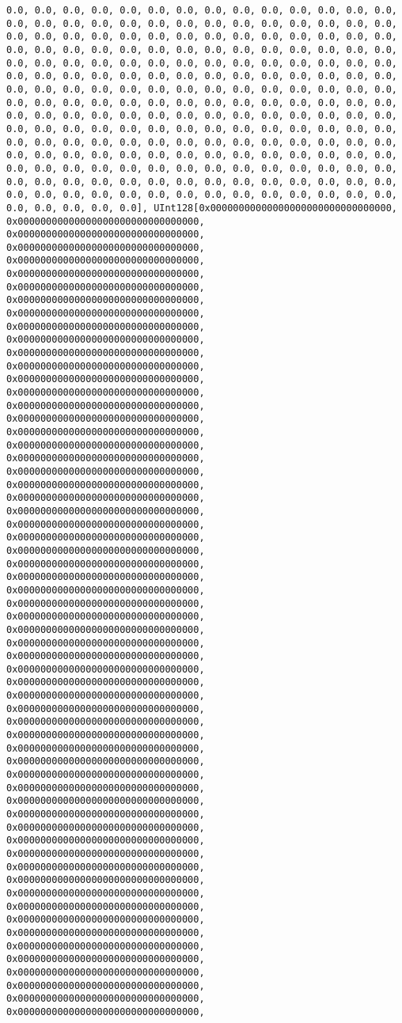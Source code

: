\documentclass[11pt]{article}
\begin{document}
\begin{verbatim}
0.0, 0.0, 0.0, 0.0, 0.0, 0.0, 0.0, 0.0, 0.0, 0.0, 0.0, 0.0, 0.0, 0.0, 0.0, 0.0, 0.0, 0.0, 0.0, 0.0, 0.0, 0.0, 0.0, 0.0, 0.0, 0.0, 0.0, 0.0, 0.0, 0.0, 0.0, 0.0, 0.0, 0.0, 0.0, 0.0, 0.0, 0.0, 0.0, 0.0, 0.0, 0.0, 0.0, 0.0, 0.0, 0.0, 0.0, 0.0, 0.0, 0.0, 0.0, 0.0, 0.0, 0.0, 0.0, 0.0, 0.0, 0.0, 0.0, 0.0, 0.0, 0.0, 0.0, 0.0, 0.0, 0.0, 0.0, 0.0, 0.0, 0.0, 0.0, 0.0, 0.0, 0.0, 0.0, 0.0, 0.0, 0.0, 0.0, 0.0, 0.0, 0.0, 0.0, 0.0, 0.0, 0.0, 0.0, 0.0, 0.0, 0.0, 0.0, 0.0, 0.0, 0.0, 0.0, 0.0, 0.0, 0.0, 0.0, 0.0, 0.0, 0.0, 0.0, 0.0, 0.0, 0.0, 0.0, 0.0, 0.0, 0.0, 0.0, 0.0, 0.0, 0.0, 0.0, 0.0, 0.0, 0.0, 0.0, 0.0, 0.0, 0.0, 0.0, 0.0, 0.0, 0.0, 0.0, 0.0, 0.0, 0.0, 0.0, 0.0, 0.0, 0.0, 0.0, 0.0, 0.0, 0.0, 0.0, 0.0, 0.0, 0.0, 0.0, 0.0, 0.0, 0.0, 0.0, 0.0, 0.0, 0.0, 0.0, 0.0, 0.0, 0.0, 0.0, 0.0, 0.0, 0.0, 0.0, 0.0, 0.0, 0.0, 0.0, 0.0, 0.0, 0.0, 0.0, 0.0, 0.0, 0.0, 0.0, 0.0, 0.0, 0.0, 0.0, 0.0, 0.0, 0.0, 0.0, 0.0, 0.0, 0.0, 0.0, 0.0, 0.0, 0.0, 0.0, 0.0, 0.0, 0.0, 0.0, 0.0, 0.0, 0.0, 0.0, 0.0, 0.0, 0.0, 0.0, 0.0, 0.0, 0.0, 0.0, 0.0, 0.0, 0.0, 0.0, 0.0, 0.0, 0.0, 0.0, 0.0, 0.0, 0.0, 0.0], UInt128[0x00000000000000000000000000000000, 0x00000000000000000000000000000000, 0x00000000000000000000000000000000, 0x00000000000000000000000000000000, 0x00000000000000000000000000000000, 0x00000000000000000000000000000000, 0x00000000000000000000000000000000, 0x00000000000000000000000000000000, 0x00000000000000000000000000000000, 0x00000000000000000000000000000000, 0x00000000000000000000000000000000, 0x00000000000000000000000000000000, 0x00000000000000000000000000000000, 0x00000000000000000000000000000000, 0x00000000000000000000000000000000, 0x00000000000000000000000000000000, 0x00000000000000000000000000000000, 0x00000000000000000000000000000000, 0x00000000000000000000000000000000, 0x00000000000000000000000000000000, 0x00000000000000000000000000000000, 0x00000000000000000000000000000000, 0x00000000000000000000000000000000, 0x00000000000000000000000000000000, 0x00000000000000000000000000000000, 0x00000000000000000000000000000000, 0x00000000000000000000000000000000, 0x00000000000000000000000000000000, 0x00000000000000000000000000000000, 0x00000000000000000000000000000000, 0x00000000000000000000000000000000, 0x00000000000000000000000000000000, 0x00000000000000000000000000000000, 0x00000000000000000000000000000000, 0x00000000000000000000000000000000, 0x00000000000000000000000000000000, 0x00000000000000000000000000000000, 0x00000000000000000000000000000000, 0x00000000000000000000000000000000, 0x00000000000000000000000000000000, 0x00000000000000000000000000000000, 0x00000000000000000000000000000000, 0x00000000000000000000000000000000, 0x00000000000000000000000000000000, 0x00000000000000000000000000000000, 0x00000000000000000000000000000000, 0x00000000000000000000000000000000, 0x00000000000000000000000000000000, 0x00000000000000000000000000000000, 0x00000000000000000000000000000000, 0x00000000000000000000000000000000, 0x00000000000000000000000000000000, 0x00000000000000000000000000000000, 0x00000000000000000000000000000000, 0x00000000000000000000000000000000, 0x00000000000000000000000000000000, 0x00000000000000000000000000000000, 0x00000000000000000000000000000000, 0x00000000000000000000000000000000, 0x00000000000000000000000000000000, 0x00000000000000000000000000000000, 0x00000000000000000000000000000000, 
\end{verbatim}
\end{document}
